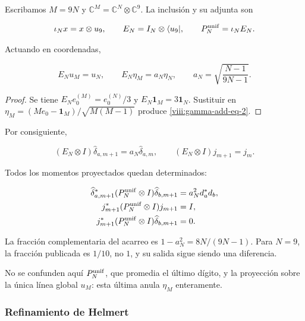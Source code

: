 Escribamos \(M=9N\) y \(\mathbb C^M=\mathbb C^N\otimes\mathbb C^9\). La inclusión y su adjunta son

\begin{equation}
\iota_Nx=x\otimes u_9,\qquad
E_N=I_N\otimes\langle u_9|,\qquad P_N^{\rm unif}=\iota_NE_N.
\label{viii:gamma-add-display-8}
\end{equation}

Actuando en coordenadas,

\begin{equation}
E_Nu_M=u_N,\qquad
E_N\eta_M=a_N\eta_N,\qquad
a_N=\sqrt{\frac{N-1}{9N-1}}.
\label{viii:gamma-add-eq-2}
\end{equation}

\begin{proof}
Se tiene \(E_Ne_0^{(M)}=e_0^{(N)}/3\) y \(E_N\mathbf1_M=3\mathbf1_N\).
Sustituir en \(\eta_M=(Me_0-\mathbf1_M)/\sqrt{M(M-1)}\)
produce \eqref{viii:gamma-add-eq-2}.
\end{proof}

Por consiguiente,

\begin{equation}
(E_N\otimes I)\widehat\delta_{a,m+1}=a_N\widehat\delta_{a,m},
\qquad
(E_N\otimes I)j_{m+1}=j_m.
\label{viii:gamma-add-eq-3}
\end{equation}

Todos los momentos proyectados quedan determinados:

\begin{equation}
\begin{aligned}
\widehat\delta_{a,m+1}^*(P_N^{\rm unif}\otimes I)\widehat\delta_{b,m+1}
 &=a_N^2d_a^*d_b,\\
j_{m+1}^*(P_N^{\rm unif}\otimes I)j_{m+1}&=I,\\
j_{m+1}^*(P_N^{\rm unif}\otimes I)\widehat\delta_{b,m+1}&=0.
\end{aligned}
\label{viii:gamma-add-eq-4}
\end{equation}

La fracción complementaria del acarreo es \(1-a_N^2=8N/(9N-1)\). Para \(N=9\), la fracción publicada es \(1/10\), no \(1\), y su salida sigue siendo una diferencia.

No se confunden aquí \(P_N^{\rm unif}\), que promedia el último dígito, y la proyección sobre la única línea global \(u_M\): esta última anula \(\eta_M\) enteramente.

\subsubsection{Refinamiento de Helmert}
\label{viii:gamma-add-sub-156}

